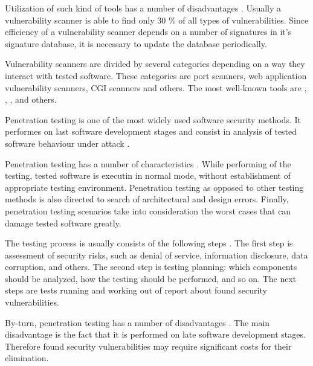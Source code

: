 %
Utilization of such kind of tools has a number of disadvantages . 
%
Usually a vulnerability scanner is able to find only 30 \% of all types of vulnerabilities. 
%
Since efficiency of a vulnerability scanner depends on a number of signatures in it's signature database, it is necessary to update the database periodically. 

%
Vulnerability scanners are divided by several categories depending on a way they interact with tested software. 
%
These categories are port scanners, web application vulnerability scanners, CGI scanners and others. 
%
The most well-known tools are  ,  ,  , and others. 



%
Penetration testing is one of the most widely used software security methods. 
%
It performes on last software development stages and consist in analysis of tested software behaviour under attack . 

%
Penetration testing has a number of characteristics . 
%
While performing of the testing, tested software is executin in normal mode, without establishment of appropriate testing environment. 
%
Penetration testing as opposed to other testing methods is also directed to search of architectural and design errors. 
%
Finally, penetration testing scenarios take into consideration the worst cases that can damage tested software greatly. 

%
The testing process is usually consists of the following steps . 
%
The first step is assessment of security risks, such as denial of service, information disclosure, data corruption, and others. 
%
The second step is testing planning: which components should be analyzed, how the testing should be performed, and so on. 
%
The next steps are tests running and working out of report about found security vulnerabilities. 

%
By-turn, penetration testing has a number of disadvantages . 
%
The main disadvantage is the fact that it is performed on late software development stages. 
%
Therefore found security vulnerabilities may require significant costs for their elimination. 